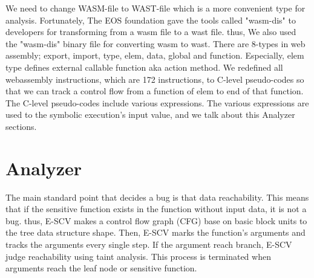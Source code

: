 We need to change WASM-file to WAST-file which is a more convenient type for analysis. Fortunately, The EOS foundation gave the tools called "wasm-dis" to developers for transforming from a wasm file to a wast file. thus, We also used the "wasm-dis" binary file for converting wasm to wast. There are 8-types in web assembly; export, import, type, elem, data, global and function. Especially, elem type defines external callable function aka action method.  We redefined all webassembly instructions, which are 172 instructions, to C-level pseudo-codes so that we can track a control flow from a function of elem to end of that function. The C-level pseudo-codes include various expressions. The various expressions are used to the symbolic execution's input value, and we talk about this Analyzer sections.

\section{Analyzer}
The main standard point that decides a bug is that data reachability. This means that if the sensitive function exists in the function without input data, it is not a bug. thus, E-SCV makes a control flow graph (CFG) base on basic block units to the tree data structure shape. Then, E-SCV marks the function's arguments and tracks the arguments every single step. If the argument reach branch, E-SCV judge reachability using taint analysis. This process is terminated when arguments reach the leaf node or sensitive function.  

